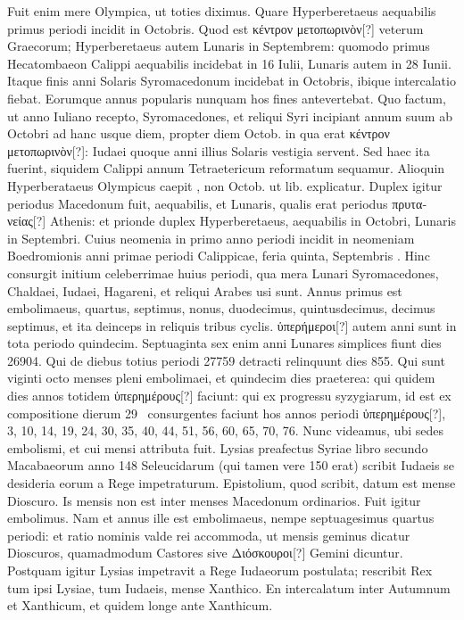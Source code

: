 Fuit enim mere Olympica,
ut toties diximus.
Quare Hyperberetaeus aequabilis primus periodi incidit
in  Octobris.
Quod est \textgreek{κέντρον μετοπωρινὸν[?]} veterum Graecorum;
Hyperberetaeus autem Lunaris in Septembrem: quomodo primus
Hecatombaeon Calippi aequabilis incidebat in 16 Iulii, Lunaris autem
in 28 Iunii.
Itaque finis anni Solaris Syromacedonum incidebat in 
Octobris, ibique intercalatio fiebat.
Eorumque annus popularis nunquam
hos fines antevertebat.
Quo factum, ut anno Iuliano recepto,
Syromacedones, et reliqui Syri incipiant annum suum ab Octobri ad
hanc usque diem, propter diem  Octob. %
 in qua erat \textgreek{κέντρον μετοπωρινὸν[?]}:
Iudaei quoque anni illius Solaris vestigia servent.
Sed haec ita fuerint,
siquidem Calippi annum Tetraetericum reformatum sequamur.
Alioquin
Hyperberataeus Olympicus caepit , non  Octob. %
 ut lib. %
explicatur.
Duplex igitur periodus Macedonum fuit, aequabilis, et
Lunaris, qualis erat periodus \textgreek{πρυτανείας[?]} Athenis:
 et prionde duplex
Hyperberetaeus, aequabilis in Octobri, Lunaris in Septembri.
Cuius neomenia in primo anno periodi incidit in neomeniam Boedromionis
anni  primae periodi Calippicae, feria quinta, Septembris
.
Hinc consurgit initium celeberrimae huius periodi,
qua mera Lunari Syromacedones, Chaldaei, Iudaei, Hagareni, et
reliqui Arabes usi sunt.
Annus primus est embolimaeus, quartus, septimus,
nonus, duodecimus, quintusdecimus, decimus septimus,
et ita deinceps in reliquis tribus cyclis.
\textgreek{ὑπερήμεροι[?]} autem anni sunt in
tota periodo quindecim.
Septuaginta sex enim anni Lunares simplices
fiunt dies 26904.
Qui de diebus totius periodi 27759 detracti
relinquunt dies 855.
Qui sunt viginti octo menses pleni embolimaei,
et quindecim dies praeterea:
 qui quidem dies annos totidem \textgreek{ὑπερημέρους[?]}
faciunt: qui ex progressu syzygiarum, id est ex compositione dierum
29~ consurgentes faciunt hos annos periodi
 \textgreek{ὑπερημέρους[?]}, 3, 10,
14, 19, 24, 30, 35, 40, 44, 51, 56, 60, 65, 70, 76.
Nunc videamus, ubi sedes embolismi, et cui mensi attributa fuit.
Lysias preafectus Syriae libro
secundo Macabaeorum anno 148 Seleucidarum (qui tamen vere 150
erat) scribit Iudaeis se desideria eorum a Rege impetraturum.
Epistolium,
quod scribit, datum est mense Dioscuro.
Is mensis non est inter
menses Macedonum ordinarios.
Fuit igitur embolimus.
Nam et
annus ille est embolimaeus, nempe septuagesimus quartus periodi: et
ratio nominis valde rei accommoda, ut mensis geminus dicatur Dioscuros,
quamadmodum Castores sive \textgreek{Διόσκουροι[?]} Gemini dicuntur.
Postquam igitur Lysias impetravit a Rege Iudaeorum postulata; rescribit
Rex tum ipsi Lysiae, tum Iudaeis, mense Xanthico.
En intercalatum
inter Autumnum et Xanthicum, et quidem longe ante Xanthicum.

